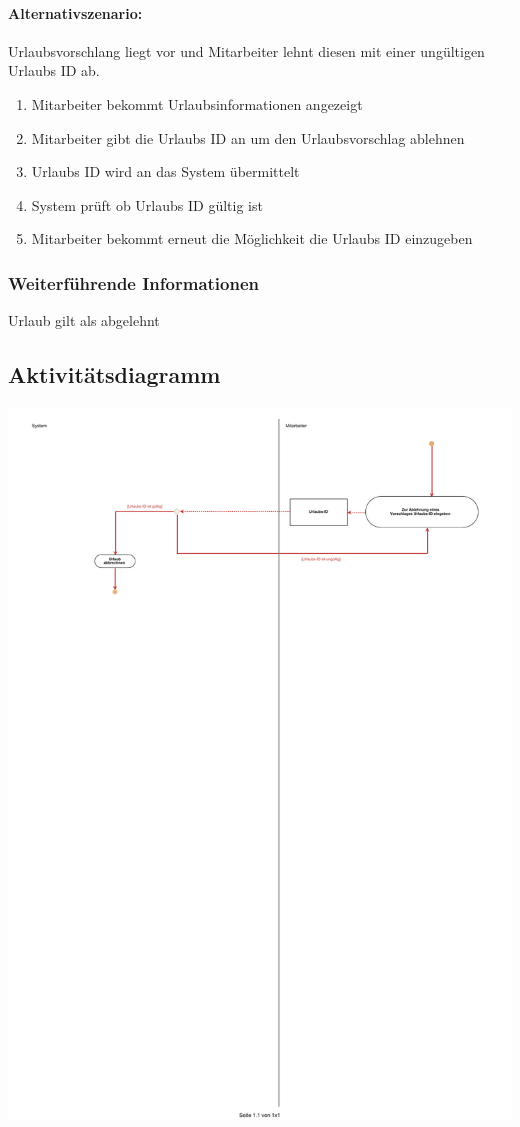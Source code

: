 \paragraph{Alternativszenario:}Urlaubsvorschlang liegt vor und Mitarbeiter lehnt diesen mit einer ungültigen Urlaubs ID ab.
\begin{enumerate}
	\item Mitarbeiter bekommt Urlaubsinformationen angezeigt
	\item Mitarbeiter gibt die Urlaubs ID an um den Urlaubsvorschlag ablehnen
	\item Urlaubs ID wird an das System übermittelt
	\item System prüft ob Urlaubs ID gültig ist
	\item Mitarbeiter bekommt erneut die Möglichkeit die Urlaubs ID einzugeben 
\end{enumerate}


\subsubsection{Weiterführende Informationen}
Urlaub gilt als abgelehnt

\subsection{Aktivitätsdiagramm}

\begin{center}
\includegraphics[width=0.9\linewidth]{Urlaubsvorschlag_ablehnen.pdf}
\end{center}

